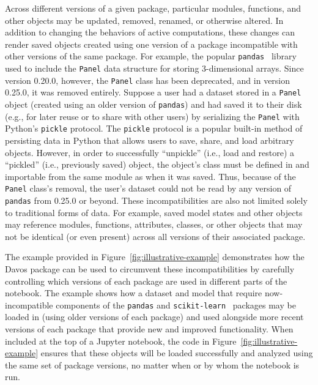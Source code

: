 \documentclass[preprint,12pt,a4paper]{elsarticle}
\begin{document}
Across different versions of a given package, particular modules, functions,
and other objects may be updated, removed, renamed, or otherwise altered. In
addition to changing the behaviors of active computations, these changes can
render saved objects created using one version of a package incompatible with
other versions of the same package. For example, the popular
\texttt{pandas}~\cite{McKi10} library used to include the \texttt{Panel} data
structure for storing 3-dimensional arrays. Since version 0.20.0, however, the
\texttt{Panel} class has been deprecated, and in version 0.25.0, it was removed
entirely. Suppose a user had a dataset stored in a \texttt{Panel} object
(created using an older version of \texttt{pandas}) and had saved it to their
disk (e.g., for later reuse or to share with other users) by serializing the
\texttt{Panel} with Python's \texttt{pickle} protocol. The \texttt{pickle}
protocol is a popular built-in method of persisting data in Python that allows
users to save, share, and load arbitrary objects. However, in order to
successfully ``unpickle'' (i.e., load and restore) a ``pickled'' (i.e., previously saved)
object, the object's class must be defined in and importable from the same
module as when it was saved. Thus, because of the \texttt{Panel} class's
removal, the user's dataset could not be read by any version of \texttt{pandas}
from 0.25.0 or beyond. These incompatibilities are also not limited solely to
traditional forms of data. For example, saved model states and other objects
may reference modules, functions, attributes, classes, or other objects that
may not be identical (or even present) across all versions of their associated
package.

The example provided in Figure~\ref{fig:illustrative-example} demonstrates how
the Davos package can be used to circumvent these incompatibilities by
carefully controlling which versions of each package are used in different
parts of the notebook. The example shows how a dataset and model that require
now-incompatible components of the \texttt{pandas} and
\texttt{scikit-learn}~\cite{PedrEtal11} packages may be loaded in (using older
versions of each package) and used alongside more recent versions of each
package that provide new and improved functionality. When included at the top
of a Jupyter notebook, the code in Figure~\ref{fig:illustrative-example}
ensures that these objects will be loaded successfully and analyzed using the
same set of package versions, no matter when or by whom the notebook is run.
\end{document}

